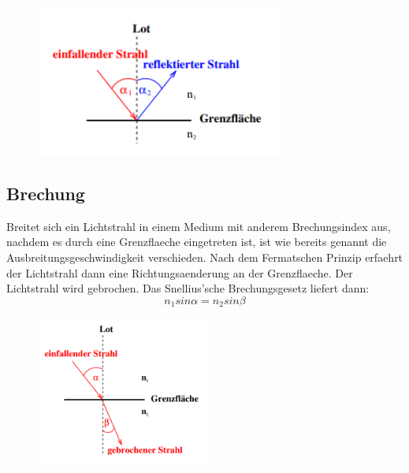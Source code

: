 \begin{figure}[H]
    \centering
    \captionsetup{justification=centering}
    \includegraphics[height=5cm]{"Reflexion_Beugung.png"}
    \label{Fig:Reflexion}
\end{figure}
\subsection{Brechung}
Breitet sich ein Lichtstrahl in einem Medium mit anderem Brechungsindex aus, nachdem es durch eine Grenzflaeche eingetreten ist, ist wie bereits genannt die Ausbreitungsgeschwindigkeit verschieden. Nach dem Fermatschen Prinzip erfaehrt der Lichtstrahl dann eine Richtungsaenderung an der Grenzflaeche. Der Lichtstrahl wird gebrochen. Das Snellius'sche Brechungsgesetz liefert dann:
\begin{equation}
    n_1sin\alpha=n_2sin\beta \label{Brechung}
\end{equation}
\begin{figure}[H]
    \centering
    \captionsetup{justification=centering}
    \includegraphics[height=5cm]{"Brechung_Beugung.png"}
    \label{Fig:Brechung}
\end{figure}
